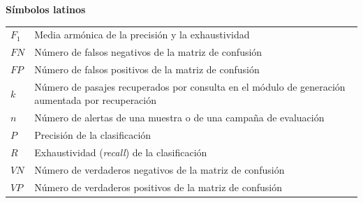 

\noindent\textbf{Símbolos latinos}

\begin{longtable}{@{}p{}p{}@{}}
$F_1$   & Media armónica de la precisión y la exhaustividad \\
$FN$    & Número de falsos negativos de la matriz de confusión \\
$FP$    & Número de falsos positivos de la matriz de confusión \\
$k$     & Número de pasajes recuperados por consulta en el módulo de generación
          aumentada por recuperación \\
$n$     & Número de alertas de una muestra o de una campaña de evaluación \\
$P$     & Precisión de la clasificación \\
$R$     & Exhaustividad (\textit{recall}) de la clasificación \\
$VN$    & Número de verdaderos negativos de la matriz de confusión \\
$VP$    & Número de verdaderos positivos de la matriz de confusión \\
\end{longtable}
